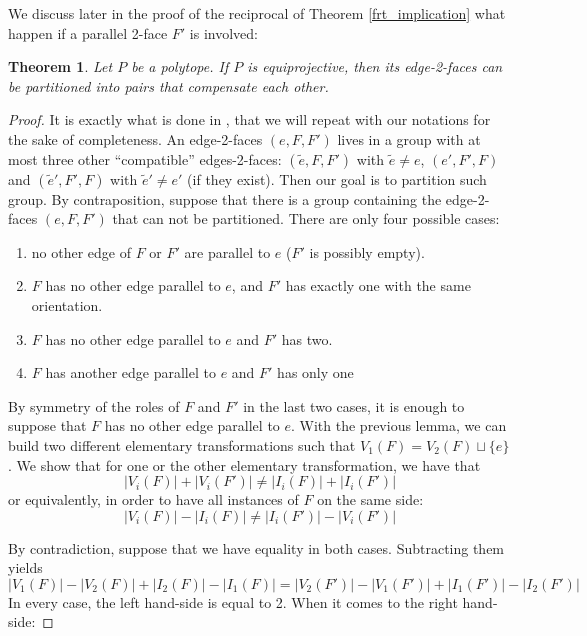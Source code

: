 \documentclass[12pt, notitlepage]{article}
\theoremstyle{plain}
\newtheorem{thm}{Theorem}[section]
\theoremstyle{definition}
\theoremstyle{plain}
\theoremstyle{remark}
\theoremstyle{plain}
\theoremstyle{plain}
\begin{document}
We discuss later in the proof of the reciprocal of Theorem \ref{frt_implication} what happen if a parallel 2-face $F'$ is involved:

\begin{thm}
    Let $P$ be a polytope. If $P$ is equiprojective, then its edge-2-faces can be partitioned into pairs that compensate each other.
\end{thm}

\begin{proof}
    It is exactly what is done in \cite{MHAL}, that we will repeat with our notations for the sake of completeness. An edge-2-faces $(e,F,F')$ lives in a group with at most three other “compatible” edges-2-faces: $(\tilde e,F,F')$ with $\tilde e \neq e $, $(e',F',F)$ and $(\tilde e',F',F)$ with $\tilde e' \neq e' $ (if they exist). Then our goal is to partition such group. By contraposition, suppose that there is a group containing the edge-2-faces $(e,F,F')$ that can not be partitioned. There are only four possible cases: \begin{enumerate}
        \item no other edge of $F$ or $F'$ are parallel to $e$ ($F'$ is possibly empty).
        \item $F$ has no other edge parallel to $e$, and $F'$ has exactly one with the same orientation.
        \item $F$ has no other edge parallel to $e$ and $F'$ has two.
        \item $F$ has another edge parallel to $e$ and $F'$ has only one
    \end{enumerate}
    By symmetry of the roles of $F$ and $F'$ in the last two cases, it is enough to suppose that $F$ has no other edge parallel to $e$. With the previous lemma, we can build two different elementary transformations such that $V_{1}(F) = V_{2}(F) \sqcup \{e\}$. We show that for one or the other elementary transformation, we have that \begin{equation} \label{eq_2}
        |V_i(F)| + |V_i(F')| \neq |I_i(F)| + |I_i(F')|
    \end{equation} or equivalently, in order to have all instances of $F$ on the same side: \[ |V_i(F)| - |I_i(F)| \neq |I_i(F')| - |V_i(F')| \]
    
    By contradiction, suppose that we have equality in both cases. Subtracting them yields \[ |V_1(F)| - |V_2(F)| + |I_2(F)| - |I_1(F)| = |V_2(F')| - |V_1(F')| + |I_1(F')| - |I_2(F')| \] In every case, the left hand-side is equal to 2. When it comes to the right hand-side:
    

\end{proof}
\end{document}

